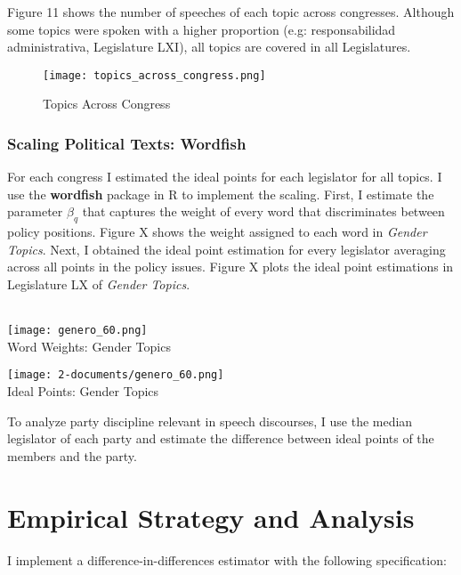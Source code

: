 \documentclass{article}
\begin{document}
Figure 11 shows the number of speeches of each topic across congresses. Although some topics were spoken with a higher proportion (e.g: responsabilidad administrativa, Legislature LXI), all topics are covered in all Legislatures. 
\begin{figure}[!h]
		\caption{Topics Across Congress}
		\centering
	\texttt{[image: topics\_across\_congress.png]} \\
\end{figure}

\subsubsection{Scaling Political Texts: Wordfish}

For each congress I estimated the ideal points for each legislator for all topics. I use the \textbf{wordfish} package in R to implement the scaling. First, I estimate the parameter $\beta_q$  that captures the weight of every word that discriminates between policy positions.  Figure X shows the weight assigned to each word in \textit{Gender Topics}. Next, I obtained the ideal point estimation for every legislator averaging across all points in the policy issues. Figure X plots the ideal point estimations in Legislature LX of  \textit{Gender Topics}. \\
\\
\begin{minipage}{0.5\textwidth}\raggedleft
	\texttt{[image: genero\_60.png]} \\
	\centering \scriptsize{Word Weights: Gender Topics}
\end{minipage}
\begin{minipage}{0.5\textwidth}\raggedleft
	\texttt{[image: 2-documents/genero\_60.png]} \\
	\centering \scriptsize{Ideal Points: Gender Topics}
\end{minipage}

To analyze party discipline relevant in speech discourses, I use the median legislator of each party and estimate the difference between ideal points of the members and the party. 

\section{Empirical Strategy and Analysis}

I implement a difference-in-differences estimator with the following specification:
\end{document}
